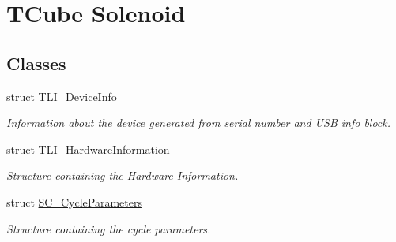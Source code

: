 \hypertarget{group___t_cube_solenoid}{}\section{T\+Cube Solenoid}
\label{group___t_cube_solenoid}
\subsection*{Classes}
\begin{DoxyCompactItemize}
\item 
struct \hyperlink{struct_t_l_i___device_info}{T\+L\+I\+\_\+\+Device\+Info}
\begin{DoxyCompactList}\small\item\em Information about the device generated from serial number and U\+SB info block. \end{DoxyCompactList}\item 
struct \hyperlink{struct_t_l_i___hardware_information}{T\+L\+I\+\_\+\+Hardware\+Information}
\begin{DoxyCompactList}\small\item\em Structure containing the Hardware Information. \end{DoxyCompactList}\item 
struct \hyperlink{struct_s_c___cycle_parameters}{S\+C\+\_\+\+Cycle\+Parameters}
\begin{DoxyCompactList}\small\item\em Structure containing the cycle parameters. \end{DoxyCompactList}\end{DoxyCompactItemize}
